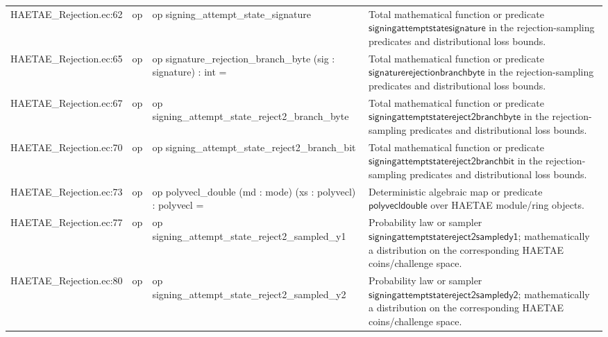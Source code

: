 \documentclass[10pt]{article}
\begin{document}
\begin{longtable}{L{0.11\textwidth}L{0.055\textwidth}L{0.385\textwidth}L{0.41\textwidth}}
HAETAE\_\allowbreak{}Rejection.\allowbreak{}ec:\allowbreak{}62 & op & {\ttfamily\scriptsize op signing\_\allowbreak{}attempt\_\allowbreak{}state\_\allowbreak{}signature} & Total mathematical function or predicate $\mathsf{signingattemptstatesignature}$ in the rejection-sampling predicates and distributional loss bounds. \\
HAETAE\_\allowbreak{}Rejection.\allowbreak{}ec:\allowbreak{}65 & op & {\ttfamily\scriptsize op signature\_\allowbreak{}rejection\_\allowbreak{}branch\_\allowbreak{}byte (sig : signature) : int =} & Total mathematical function or predicate $\mathsf{signaturerejectionbranchbyte}$ in the rejection-sampling predicates and distributional loss bounds. \\
HAETAE\_\allowbreak{}Rejection.\allowbreak{}ec:\allowbreak{}67 & op & {\ttfamily\scriptsize op signing\_\allowbreak{}attempt\_\allowbreak{}state\_\allowbreak{}reject2\_\allowbreak{}branch\_\allowbreak{}byte} & Total mathematical function or predicate $\mathsf{signingattemptstatereject2branchbyte}$ in the rejection-sampling predicates and distributional loss bounds. \\
HAETAE\_\allowbreak{}Rejection.\allowbreak{}ec:\allowbreak{}70 & op & {\ttfamily\scriptsize op signing\_\allowbreak{}attempt\_\allowbreak{}state\_\allowbreak{}reject2\_\allowbreak{}branch\_\allowbreak{}bit} & Total mathematical function or predicate $\mathsf{signingattemptstatereject2branchbit}$ in the rejection-sampling predicates and distributional loss bounds. \\
HAETAE\_\allowbreak{}Rejection.\allowbreak{}ec:\allowbreak{}73 & op & {\ttfamily\scriptsize op polyvecl\_\allowbreak{}double (md : mode) (xs : polyvecl) : polyvecl =} & Deterministic algebraic map or predicate $\mathsf{polyvecldouble}$ over HAETAE module/ring objects. \\
HAETAE\_\allowbreak{}Rejection.\allowbreak{}ec:\allowbreak{}77 & op & {\ttfamily\scriptsize op signing\_\allowbreak{}attempt\_\allowbreak{}state\_\allowbreak{}reject2\_\allowbreak{}sampled\_\allowbreak{}y1} & Probability law or sampler $\mathsf{signingattemptstatereject2sampledy1}$; mathematically a distribution on the corresponding HAETAE coins/challenge space. \\
HAETAE\_\allowbreak{}Rejection.\allowbreak{}ec:\allowbreak{}80 & op & {\ttfamily\scriptsize op signing\_\allowbreak{}attempt\_\allowbreak{}state\_\allowbreak{}reject2\_\allowbreak{}sampled\_\allowbreak{}y2} & Probability law or sampler $\mathsf{signingattemptstatereject2sampledy2}$; mathematically a distribution on the corresponding HAETAE coins/challenge space. \\

\end{longtable}
\end{document}
